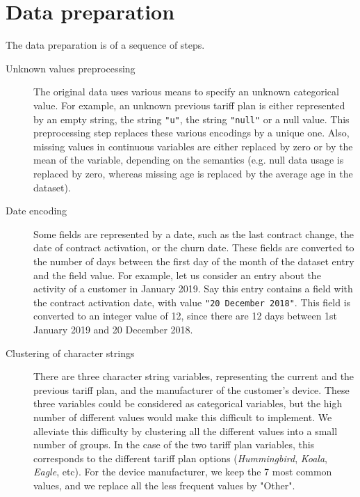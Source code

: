 \section{Data preparation}
\label{sec:data_pre}

The data preparation is of a sequence of steps.

\begin{description}

	\item[Unknown values preprocessing] The original data uses various means to
	specify an unknown categorical value. For example, an unknown previous
	tariff plan is either represented by an empty string, the string
	\texttt{"u"}, the string \texttt{"null"} or a null value. This preprocessing
	step replaces these various encodings by a unique one. Also, missing values
	in continuous variables are either replaced by zero or by the mean of the
	variable, depending on the semantics (e.g. null data usage is replaced by
	zero, whereas missing age is replaced by the average age in the dataset).

	\item[Date encoding] Some fields are represented by a date, such as the last
	contract change, the date of contract activation, or the churn date. These
	fields are converted to the number of days between the first day of the
	month of the dataset entry and the field value. For example, let us consider
	an entry about the activity of a customer in January 2019. Say this entry
	contains a field with the contract activation date, with value \texttt{"20
	December 2018"}. This field is converted to an integer value of 12,
	since there are 12 days between 1st January 2019 and 20 December 2018.

    \item[Clustering of character strings] There are three character string
    variables, representing the current and the previous tariff plan, and the
    manufacturer of the customer's device. These three variables could be
    considered as categorical variables, but the high number of different values
    would make this difficult to implement. We alleviate this difficulty by
    clustering all the different values into a small number of groups. In the
    case of the two tariff plan variables, this corresponds to the different
    tariff plan options (\emph{Hummingbird}, \emph{Koala}, \emph{Eagle}, etc).
    For the device manufacturer, we keep the 7 most common values, and we
    replace all the less frequent values by "Other".


\end{description}
